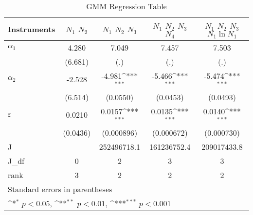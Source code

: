 \begin{table}[htbp]\centering
\newcommand{\sym}[1]{\ifmmode^{#1}\else\(^{#1}\)\fi}
\caption{GMM Regression Table}
\begin{tabular}{l*{4}{c}}
\hline\hline
Instruments           &\multicolumn{1}{c}{$N_1$ $N_2$}&\multicolumn{1}{c}{$N_1$ $N_2$ $N_3$}&\multicolumn{1}{c}{$N_1$ $N_2$ $N_3$ $N_4$}&\multicolumn{1}{c}{$N_1$ $N_2$ $N_3$ $N_1\ln N_1$}\\
\hline
$\alpha_1$           &       4.280         &       7.049         &       7.457         &       7.503         \\
                    &     (6.681)         &         (.)         &         (.)         &         (.)         \\
\hline
$\alpha_2$           &      -2.528         &      -4.981\sym{***}&      -5.466\sym{***}&      -5.474\sym{***}\\
                    &     (6.514)         &    (0.0550)         &    (0.0453)         &    (0.0493)         \\
\hline
$\varepsilon$       &      0.0210         &      0.0157\sym{***}&      0.0135\sym{***}&      0.0140\sym{***}\\
                    &    (0.0436)         &  (0.000896)         &  (0.000672)         &  (0.000730)         \\
\hline
J                   &                     & 252496718.1         & 161236752.4         & 209017433.8         \\
J\_df                &           0         &           2         &           3         &           3         \\
rank                &           3         &           2         &           2         &           2         \\
\hline\hline
\multicolumn{5}{l}{\footnotesize Standard errors in parentheses}\\
\multicolumn{5}{l}{\footnotesize \sym{*} \(p<0.05\), \sym{**} \(p<0.01\), \sym{***} \(p<0.001\)}\\
\end{tabular}\label{tab:gmm_table}
\end{table}
